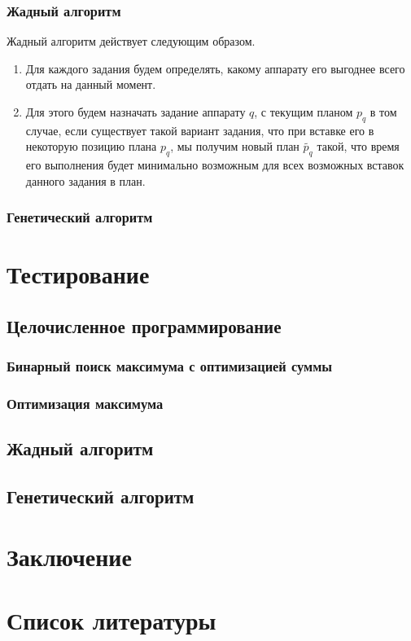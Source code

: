 \documentclass[a4paper,14pt,russian]{article}
\begin{document}

\subsubsection{Жадный алгоритм}
Жадный алгоритм действует следующим образом.



\begin{enumerate}
\item Для каждого задания будем определять, какому аппарату его выгоднее всего отдать на данный момент.
\item Для этого будем назначать задание аппарату $q$, с текущим планом $p_q$ в том случае, если существует такой вариант задания, что при вставке его в некоторую позицию плана $p_q$, мы получим новый план $\widetilde{p_q}$ такой, что время его выполнения будет минимально возможным для всех возможных вставок данного задания в план.
\end{enumerate}
\subsubsection{Генетический алгоритм}


\section{Тестирование}
\subsection{Целочисленное программирование}
\subsubsection{Бинарный поиск максимума с оптимизацией суммы}
\subsubsection{Оптимизация максимума}
\subsection{Жадный алгоритм}
\subsection{Генетический алгоритм}

\section{Заключение}

\section*{Список литературы}
\end{document}
